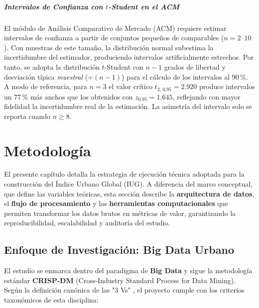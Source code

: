 \documentclass[12pt, a4paper, twoside, openright]{report}
\theoremstyle{plain}
\theoremstyle{definition}
\newcommand{\IUG}{IUG}             %
\begin{document}
\paragraph{Intervalos de Confianza con $t$-Student en el ACM}
El módulo de Análisis Comparativo de Mercado (ACM) requiere estimar intervalos de confianza a partir de conjuntos pequeños de comparables ($n = 2$--$10$). Con muestras de este tamaño, la distribución normal subestima la incertidumbre del estimador, produciendo intervalos artificialmente estrechos. Por tanto, se adopta la distribución $t$-Student con $n-1$ grados de libertad y desviación típica \emph{muestral} ($\div (n-1)$) para el cálculo de los intervalos al 90\,\%. A modo de referencia, para $n = 3$ el valor crítico $t_{2,\,0.95} = 2.920$ produce intervalos un 77\,\% más anchos que los obtenidos con $z_{0.95} = 1.645$, reflejando con mayor fidelidad la incertidumbre real de la estimación. La asimetría del intervalo solo se reporta cuando $n \geq 8$.







\chapter{Metodología}\label{ch:metodologia}

El presente capítulo detalla la estrategia de ejecución técnica adoptada para la construcción del Índice Urbano Global (\IUG). A diferencia del marco conceptual, que define las variables teóricas, esta sección describe la \textbf{arquitectura de datos}, el \textbf{flujo de procesamiento} y las \textbf{herramientas computacionales} que permiten transformar los datos brutos en métricas de valor, garantizando la reproducibilidad, escalabilidad y auditoría del estudio.

\section{Enfoque de Investigación: Big Data Urbano}

El estudio se enmarca dentro del paradigma de \textbf{Big Data} y sigue la metodología estándar \textbf{CRISP-DM} (Cross-Industry Standard Process for Data Mining). Según la definición canónica de las "3 Vs" \citep{laney2001}, el proyecto cumple con los criterios taxonómicos de esta disciplina:
\end{document}

